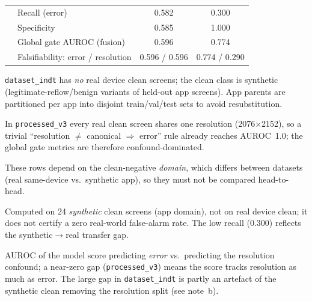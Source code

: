\begin{table}[t]
\begin{threeparttable}
\begin{tabular}{l l c c}
 & Recall (error)                    & 0.582 & 0.300 \\
 & Specificity                       & 0.585 & 1.000\tnote{d} \\
 & Global gate AUROC (fusion)        & 0.596 & 0.774 \\
 & Falsifiability: error / resolution& 0.596 / 0.596\tnote{e} & 0.774 / 0.290 \\
\bottomrule
\end{tabular}
\begin{tablenotes}[flush]
\footnotesize
\item[a] \texttt{dataset\_indt} has \emph{no} real device clean screens; the clean class is
synthetic (legitimate-reflow/benign variants of held-out app screens). App parents are
partitioned per app into disjoint train/val/test sets to avoid resubstitution.
\item[b] In \texttt{processed\_v3} every real clean screen shares one resolution
(2076$\times$2152), so a trivial ``resolution $\neq$ canonical $\Rightarrow$ error'' rule
already reaches AUROC~1.0; the global gate metrics are therefore confound-dominated.
\item[c] These rows depend on the clean-negative \emph{domain}, which differs between datasets
(real same-device vs.\ synthetic app), so they must not be compared head-to-head.
\item[d] Computed on 24 \emph{synthetic} clean screens (app domain), not on real device clean;
it does not certify a zero real-world false-alarm rate. The low recall (0.300) reflects the
synthetic$\rightarrow$real transfer gap.
\item[e] AUROC of the model score predicting \emph{error} vs.\ predicting the resolution
confound; a near-zero gap (\texttt{processed\_v3}) means the score tracks resolution as much as
error. The large gap in \texttt{dataset\_indt} is partly an artefact of the synthetic clean
removing the resolution split (see note~b).
\end{tablenotes}
\end{threeparttable}
\end{table}

